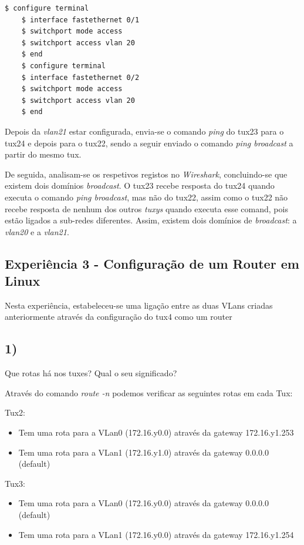 \documentclass[11pt]{article}
\begin{document}
\begin{lstlisting}[language=bash]
    $ configure terminal
    $ interface fastethernet 0/1
    $ switchport mode access
    $ switchport access vlan 20
    $ end
    $ configure terminal
    $ interface fastethernet 0/2            
    $ switchport mode access
    $ switchport access vlan 20
    $ end
\end{lstlisting}

Depois da \textit{vlan21} estar configurada, envia-se o comando \textit{ping} do tux23 para o tux24 e depois para o tux22, sendo a seguir enviado o comando \textit{ping broadcast} a partir do mesmo tux.

De seguida, analisam-se os respetivos registos no \textit{Wireshark}, concluindo-se que existem dois domínios \textit{broadcast}. O tux23 recebe resposta do tux24 quando executa o comando \textit{ping broadcast}, mas não do tux22, assim como o tux22 não recebe resposta de nenhum dos outros \textit{tuxys} quando executa esse comand, pois estão ligados a sub-redes diferentes. Assim, existem dois domínios de \textit{broadcast}: a \textit{vlan20} e a \textit{vlan21}. 

\subsection{Experiência 3 - Configuração de um Router em Linux}

Nesta experiência, estabeleceu-se uma ligação entre as duas VLans criadas anteriormente através da configuração do tux4 como um router

\subsection{1)} Que rotas há nos tuxes? Qual o seu significado?

Através do comando \emph{route -n} podemos verificar as seguintes rotas em cada Tux:


Tux2:
\begin{itemize}
\item Tem uma rota para a VLan0 (172.16.y0.0) através da gateway 172.16.y1.253
\item Tem uma rota para a VLan1 (172.16.y1.0) através da gateway 0.0.0.0 (default)

\end{itemize}

Tux3:
\begin{itemize}
\item Tem uma rota para a VLan0 (172.16.y0.0) através da gateway 0.0.0.0 (default)
\item Tem uma rota para a VLan1 (172.16.y0.0) através da gateway 172.16.y1.254

\end{itemize}
\end{document}
